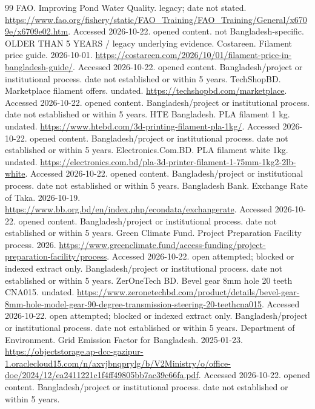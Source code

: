 \documentclass[11pt,a4paper]{article}
\begin{document}
\begin{thebibliography}{99}
 FAO. Improving Pond Water Quality. legacy; date not stated. \url{https://www.fao.org/fishery/static/FAO_Training/FAO_Training/General/x6709e/x6709e02.htm}. Accessed 2026-10-22. opened content. not Bangladesh-specific. OLDER THAN 5 YEARS / legacy underlying evidence.
 Costareen. Filament price guide. 2026-10-01. \url{https://costareen.com/2026/10/01/filament-price-in-bangladesh-guide/}. Accessed 2026-10-22. opened content. Bangladesh/project or institutional process. date not established or within 5 years.
 TechShopBD. Marketplace filament offers. undated. \url{https://techshopbd.com/marketplace}. Accessed 2026-10-22. opened content. Bangladesh/project or institutional process. date not established or within 5 years.
 HTE Bangladesh. PLA filament 1 kg. undated. \url{https://www.htebd.com/3d-printing-filament-pla-1kg/}. Accessed 2026-10-22. opened content. Bangladesh/project or institutional process. date not established or within 5 years.
 Electronics.Com.BD. PLA filament white 1kg. undated. \url{https://electronics.com.bd/pla-3d-printer-filament-1-75mm-1kg2-2lb-white}. Accessed 2026-10-22. opened content. Bangladesh/project or institutional process. date not established or within 5 years.
 Bangladesh Bank. Exchange Rate of Taka. 2026-10-19. \url{https://www.bb.org.bd/en/index.php/econdata/exchangerate}. Accessed 2026-10-22. opened content. Bangladesh/project or institutional process. date not established or within 5 years.
 Green Climate Fund. Project Preparation Facility process. 2026. \url{https://www.greenclimate.fund/access-funding/project-preparation-facility/process}. Accessed 2026-10-22. open attempted; blocked or indexed extract only. Bangladesh/project or institutional process. date not established or within 5 years.
 ZerOneTech BD. Bevel gear 8mm hole 20 teeth CNA015. undated. \url{https://www.zeronetechbd.com/product/details/bevel-gear-8mm-hole-model-gear-90-degree-transmission-steering-20-teethcna015}. Accessed 2026-10-22. open attempted; blocked or indexed extract only. Bangladesh/project or institutional process. date not established or within 5 years.
 Department of Environment. Grid Emission Factor for Bangladesh. 2025-01-23. \url{https://objectstorage.ap-dcc-gazipur-1.oraclecloud15.com/n/axvjbnqprylg/b/V2Ministry/o/office-doe/2024/12/ea2411221c1f4ff49805bb7ac39c66fa.pdf}. Accessed 2026-10-22. opened content. Bangladesh/project or institutional process. date not established or within 5 years.

\end{thebibliography}
\end{document}
